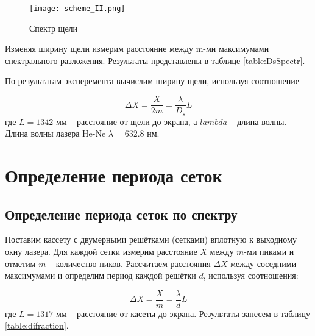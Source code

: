     \begin{figure}
    	\centering
    	\texttt{[image: scheme\_II.png]}
    	\caption{Спектр щели}
    \end{figure}

	Изменяя ширину щели измерим расстояние между m-ми максимумами спектрального разложения. Результаты представлены в таблице \ref{table:DsSpectr}.
	
	
	
	По результатам эксперемента вычислим ширину щели, используя соотношение
	
	\begin{equation}
		\Delta X = \frac{X}{2 m} = \frac{\lambda}{D_s} L
	\end{equation}
	где $L = 1342$ мм -- расстояние от щели до экрана, а $lambda$ -- длина волны. Длина волны лазера He-Ne $\lambda = 632.8$ нм.

    \section{Определение периода сеток}
    \subsection{Определение периода сеток по спектру}
    
    Поставим кассету с двумерными решётками (сетками) вплотную к выходному окну лазера. Для каждой сетки измерим расстояние $X$ между $m$-ми пиками и отметим $m$ -- количество пиков. Рассчитаем расстояния $\Delta X$ между соседними максимумами и определим период каждой решётки $d$, используя соотношения:
    
    \begin{equation}
    \Delta X=\frac{X}{m}=\frac{\lambda}{d} L
    \end{equation}
    где $L = 1317$ мм -- расстояние от касеты до экрана. Результаты занесем в таблицу \ref{table:difraction}.
    
